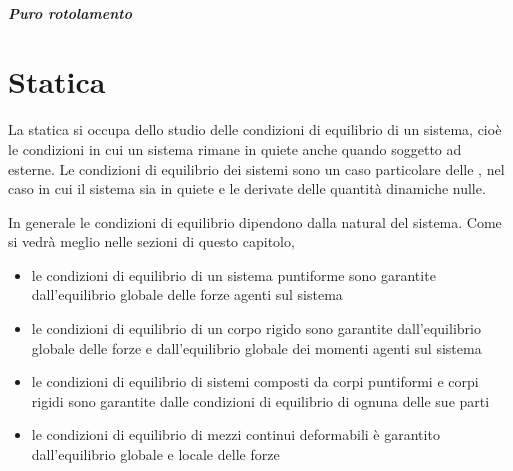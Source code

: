 \documentclass[letterpaper,10pt,italian]{jupyterBook}
\begin{document}
\paragraph{Puro rotolamento}
\label{\detokenize{ch/mechanics/actions-examples:puro-rotolamento}}
\sphinxstepscope


\chapter{Statica}
\label{\detokenize{ch/mechanics/statics:statica}}\label{\detokenize{ch/mechanics/statics:physics-hs-mechanics-statics}}\label{\detokenize{ch/mechanics/statics::doc}}
\sphinxAtStartPar
La statica si occupa dello studio delle condizioni di equilibrio di un sistema, cioè le condizioni in cui un sistema rimane in quiete anche quando soggetto ad {\hyperref[\detokenize{ch/mechanics/actions:physics-hs-mechanics-actions}]{}} esterne. Le condizioni di equilibrio dei sistemi sono un caso particolare delle {\hyperref[\detokenize{ch/mechanics/dynamics:physics-hs-mechanics-dynamics}]{}}, nel caso in cui il sistema sia in quiete e le derivate delle quantità dinamiche nulle.

\sphinxAtStartPar
In generale le condizioni di equilibrio dipendono dalla natural del sistema. Come si vedrà meglio nelle sezioni di questo capitolo,
\begin{itemize}
\item {} 
\sphinxAtStartPar
le condizioni di equilibrio di un sistema puntiforme sono garantite dall’equilibrio globale delle forze agenti sul sistema

\item {} 
\sphinxAtStartPar
le condizioni di equilibrio di un corpo rigido sono garantite dall’equilibrio globale delle forze e dall’equilibrio globale dei momenti agenti sul sistema

\item {} 
\sphinxAtStartPar
le condizioni di equilibrio di sistemi composti da corpi puntiformi e corpi rigidi sono garantite dalle condizioni di equilibrio di ognuna delle sue parti

\item {} 
\sphinxAtStartPar
le condizioni di equilibrio di mezzi continui deformabili è garantito dall’equilibrio globale e locale delle forze

\end{itemize}

\sphinxstepscope
\end{document}

